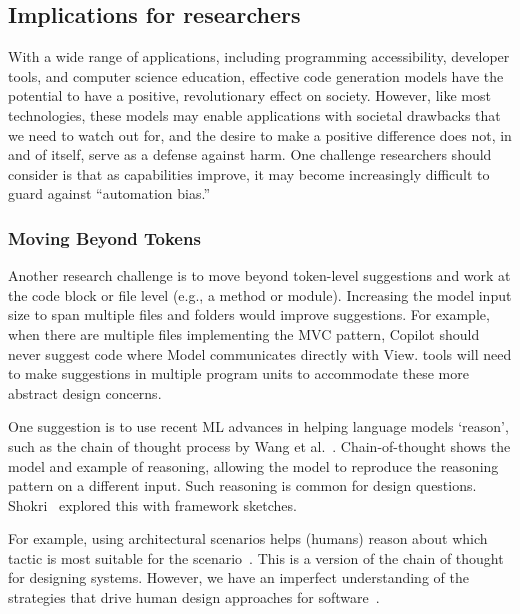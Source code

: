 

\subsection{Implications for researchers}
With a wide range of applications, including programming accessibility, developer tools, and computer science education, effective code generation models have the potential to have a positive, revolutionary effect on society. 
However, like most technologies, these models may enable applications with societal drawbacks that we need to watch out for, and the desire to make a positive difference does not, in and of itself, serve as a defense against harm.
One challenge researchers should consider is that as capabilities improve, it may become increasingly difficult to guard against “automation bias.”

\subsubsection{Moving Beyond Tokens}
\label{tokens}
Another research challenge is to move beyond token-level suggestions and work at the code block or file level (e.g., a method or module). 
Increasing the model input size to span multiple files and folders would improve suggestions. For example, when there are multiple files implementing the MVC pattern, Copilot should never suggest code where \textsf{Model} communicates directly with \textsf{View}. 
\AISE{} tools will need to make suggestions in multiple program units to accommodate these more abstract design concerns.

One suggestion is to use recent ML advances in helping language models `reason', such as the chain of thought process by Wang et al.~\cite{chain_of_thought}. 
Chain-of-thought shows the model and example of reasoning, allowing the model to reproduce the reasoning pattern on a different input.
Such reasoning is common for design questions. 
Shokri~\cite{shokri21} explored this with framework sketches.

For example, using architectural scenarios helps (humans) reason about which tactic is most suitable for the scenario~\cite{kazman98}. This is a version of the chain of thought for designing systems. 
However, we have an imperfect understanding of the strategies that drive human design approaches for software~\cite{Arab2022}. 